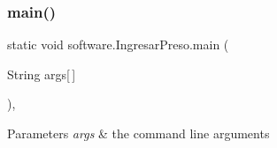 \mbox{\label{classsoftware_1_1_ingresar_preso_a9ead7a0bf8ad05ff0726a2d7892147a2}} 
\subsubsection{\texorpdfstring{main()}{main()}}
{\footnotesize\ttfamily static void software.\+Ingresar\+Preso.\+main (\begin{DoxyParamCaption}\item[{String}]{args\mbox{[}$\,$\mbox{]} }\end{DoxyParamCaption})\hspace{0.3cm}{\ttfamily [inline]}, {\ttfamily [static]}}


\begin{DoxyParams}{Parameters}
{\em args} & the command line arguments \\
\hline
\end{DoxyParams}


